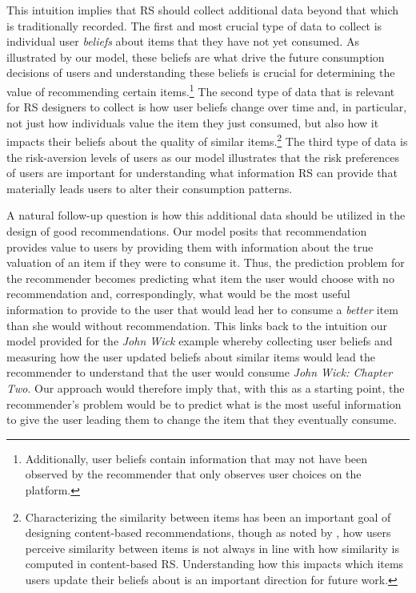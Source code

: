 \documentclass[sigconf]{acmart}
\begin{document}
This intuition implies that RS should collect additional data beyond that which is traditionally recorded. The first and most crucial type of data to collect is individual user \textit{beliefs} about items that they have not yet consumed. As illustrated by our model, these beliefs are what drive the future consumption decisions of users and understanding these beliefs is crucial for determining the value of recommending certain items.\footnote{Additionally, user beliefs contain information that may not have been observed by the recommender that only observes user choices on the platform.} The second type of data that is relevant for RS designers to collect is how user beliefs change over time and, in particular, not just how individuals value the item they just consumed, but also how it impacts their beliefs about the quality of similar items.\footnote{Characterizing the similarity between items has been an important goal of designing content-based recommendations, though as noted by \cite{winecoff2019users}, how users perceive similarity between items is not always in line with how similarity is computed in content-based RS. Understanding how this impacts which items users update their beliefs about is an important direction for future work.} The third type of data is the risk-aversion levels of users as our model illustrates that the risk preferences of users are important for understanding what information RS can provide that materially leads users to alter their consumption patterns.

 
A natural follow-up question is how this additional data should be utilized in the design of good recommendations. Our model posits that recommendation provides value to users by providing them with information about the true valuation of an item if they were to consume it. Thus, the prediction problem for the recommender becomes predicting what item the user would choose with no recommendation and, correspondingly, what would be the most useful information to provide to the user that would lead her to consume a \textit{better} item than she would without recommendation. This links back to the intuition our model provided for the \textit{John Wick} example whereby collecting user beliefs and measuring how the user updated beliefs about similar items would lead the recommender to understand that the user would consume \textit{John Wick: Chapter Two}. Our approach would therefore imply that, with this as a starting point, the recommender's problem would be to predict what is the most useful information to give the user leading them to change the item that they eventually consume.
\end{document}
